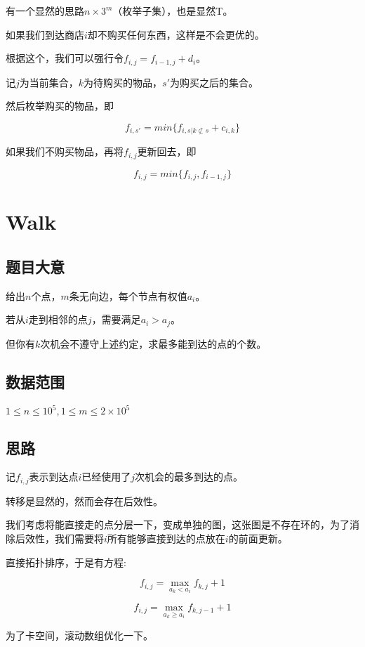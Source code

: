 \documentclass{ctexart}
\numberwithin{equation}{section}
\begin{document}
\begin{flushleft}
  有一个显然的思路$n\times 3^m$（枚举子集），也是显然T。

  如果我们到达商店$i$却不购买任何东西，这样是不会更优的。

  根据这个，我们可以强行令$f_{i,j}=f_{i-1,j}+d_i$。

  记$j$为当前集合，$k$为待购买的物品，$s'$为购买之后的集合。
  
  然后枚举购买的物品，即

  $$f_{i,s'}= min\{f_{i,s | k \not\subset s} + c_{i,k}\}$$

  如果我们不购买物品，再将$f_{i,j}$更新回去，即

  $$f_{i,j}=min\{f_{i,j},f_{i-1,j}\}$$
  \newpage

  \section{Walk}
  \subsection{题目大意}
  给出$n$个点，$m$条无向边，每个节点有权值$a_i$。

  若从$i$走到相邻的点$j$，需要满足$a_i>a_j$。

  但你有$k$次机会不遵守上述约定，求最多能到达的点的个数。
  
  \subsection{数据范围}
  $1\le n \le 10^5,1\le m\le 2\times 10^5$
  \subsection{思路}
  记$f_{i,j}$表示到达点$i$已经使用了$j$次机会的最多到达的点。

  转移是显然的，然而会存在后效性。

  我们考虑将能直接走的点分层一下，变成单独的图，这张图是不存在环的，为了消除后效性，我们需要将$i$所有能够直接到达的点放在$i$的前面更新。

  直接拓扑排序，于是有方程:

  $$f_{i,j}=\max_{a_k<a_i}f_{k,j}+1$$

  $$f_{i,j}=\max_{a_k \ge a_i}f_{k,j-1}+1$$

  为了卡空间，滚动数组优化一下。
  
  \newpage


\end{flushleft}
\end{document}
